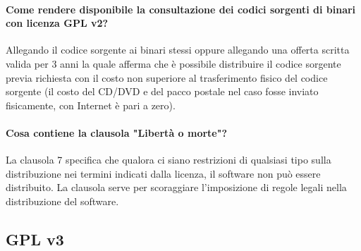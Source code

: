 \documentclass[a4paper]{article}
\begin{document}
			
			\paragraph{Come rendere disponibile la consultazione dei codici sorgenti di binari con licenza GPL v2?} %
			Allegando il codice sorgente ai binari stessi oppure allegando una offerta scritta valida per 3 anni la quale afferma che è possibile distribuire il codice sorgente previa richiesta con il costo non superiore al trasferimento fisico del codice sorgente (il costo del CD/DVD e del pacco postale nel caso fosse inviato fisicamente, con Internet è pari a zero).
			
			\paragraph{Cosa contiene la clausola "Libertà o morte"?}
				La clausola 7 specifica che qualora ci siano restrizioni di qualsiasi tipo sulla distribuzione nei termini indicati dalla licenza, il software non può essere distribuito. La clausola serve per scoraggiare l'imposizione di regole legali nella distribuzione del software.
		
		\subsection{GPL v3}
			
\end{document}
